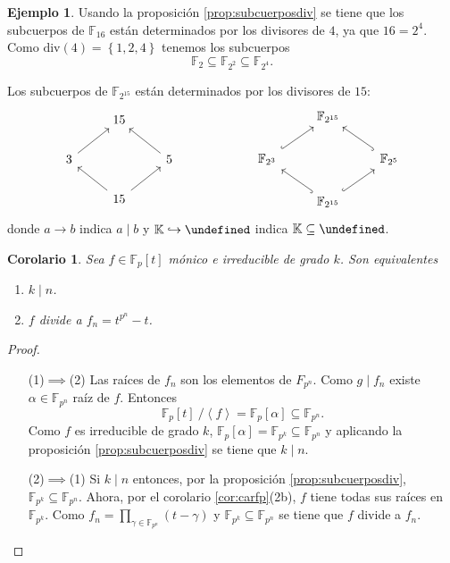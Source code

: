 \documentclass[10pt, spanish]{report}
\newtheorem{cor}{Corolario}[tma]
\theoremstyle{definition}
\newtheorem*{ej}{Ejemplo}
\theoremstyle{custom}
\theoremstyle{remark}
\newcommand{\F}{\mathbb{F}}
\newcommand{\K}{\mathbb{K}}
\let\L\undefined
\newcommand{\L}{\mathbb{L}}
\newcommand{\fecha}[1]{\marginpar{\underline{\footnotesize{#1}}}}
\begin{document}
\fecha{23/03}
\begin{ej}
    Usando la proposición \ref{prop:subcuerposdiv} se tiene que los subcuerpos
    de $\F_{16}$ están determinados por los divisores de $4$, ya que $16=2^4$.
    Como $\text{div}(4)=\left\{ 1,2,4 \right\}$ tenemos los subcuerpos
    \[\F_2\subseteq\F_{2^2}\subseteq\F_{2^4}.\]

    Los subcuerpos de $\F_{2^{15}}$ están determinados por los divisores de
    $15$:\[\begin{tikzcd}
              & 15               & \\
        3 \ar[ur] &                  & 5 \ar[ul] \\
                  & 15\ar[ul]\ar[ur] &
    \end{tikzcd}\hspace{6em}
    \begin{tikzcd}
              & \F_{2^{15}}              & \\
        \F_{2^3} \ar[hook,ur] &                  & \F_{2^5} \ar[hook,ul] \\
                         & \F_{2^{15}}\ar[hook,ul]\ar[hook, ur] &
    \end{tikzcd}\]
    donde $a\to b$ indica $a\mid b$ y $\K\hookrightarrow\L$ indica
    $\K\subseteq\L$.  
\end{ej}

\begin{cor}
    Sea $f\in\F_p[t]$ mónico e irreducible de grado $k$. Son equivalentes
    \begin{enumerate}
        \item $k\mid n$.
        \item $f$ divide a $f_n = t^{p^n}-t$.
    \end{enumerate}
\end{cor}

\begin{proof}
    \hspace{0pt}
    \begin{itemize}[itemindent=36pt]
        \item[(1)$\implies$(2)] Las raíces de $f_n$ son los elementos de
            $F_{p^n}$. Como $g\mid f_n$ existe $\alpha\in\F_{p^n}$ raíz de $f$.
            Entonces \[\F_p[t]\ /\left<f\right>=\F_p[\alpha]\subseteq\F_{p^n}.\]
            Como $f$ es irreducible de grado $k$,
            $\F_p[\alpha]=\F_{p^k}\subseteq \F_{p^n}$ y aplicando la
            proposición \ref{prop:subcuerposdiv} se tiene que $k\mid n$.
        \item[(2)$\implies$(1)] Si $k\mid n$ entonces, por la
            proposición \ref{prop:subcuerposdiv}, $\F_{p^k}\subseteq\F_{p^n}$.
            Ahora, por el corolario \ref{cor:carfp}(2b), $f$ tiene todas sus
            raíces en $\F_{p^k}$. Como $f_n=\prod_{\gamma\in\F_{p^n}}(t-\gamma)$
            y $\F_{p^k}\subseteq\F_{p^n}$ se tiene  que $f$ divide a $f_n$.
    \end{itemize}
\end{proof}
\end{document}
